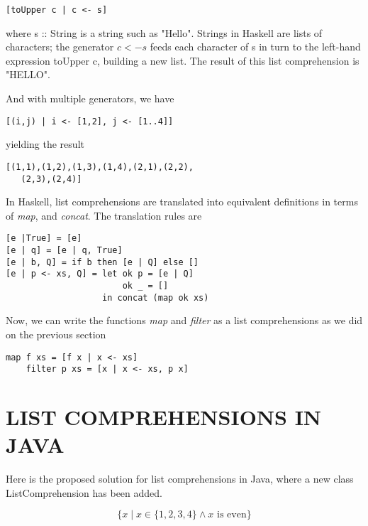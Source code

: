 \documentclass[%
 reprint,
 amsmath,amssymb,
 aps,
]{revtex4-1}
\begin{document}
    \begin{lstlisting}[frame=none]
    [toUpper c | c <- s]
    \end{lstlisting}

	where s :: String is a string such as "Hello". Strings in Haskell are lists of characters; the generator $c <- s$ feeds each character of s in turn to the left-hand expression toUpper c, building a new list. The result of this list comprehension is "HELLO".\cite{haskellwiki}

    And with multiple generators, we have

    \begin{lstlisting}[frame=none]
    [(i,j) | i <- [1,2], j <- [1..4]]
    \end{lstlisting}

	yielding the result

    \begin{lstlisting}[frame=none]
    [(1,1),(1,2),(1,3),(1,4),(2,1),(2,2),
   (2,3),(2,4)]
    \end{lstlisting}

    In Haskell, list comprehensions are translated into equivalent definitions in terms of \emph{map}, and \emph{concat}\cite{wadler}. The translation rules are

    \begin{lstlisting}[frame=none]
[e |True] = [e]
[e | q] = [e | q, True]
[e | b, Q] = if b then [e | Q] else []
[e | p <- xs, Q] = let ok p = [e | Q]
                       ok _ = []
                   in concat (map ok xs)
    \end{lstlisting}

    Now, we can write the functions \emph{map} and \emph{filter} as a list comprehensions as we did on the previous section

    \begin{lstlisting}[frame=none]
       map f xs = [f x | x <- xs]
    filter p xs = [x | x <- xs, p x]
    \end{lstlisting}

\section{LIST COMPREHENSIONS IN JAVA}

	Here is the proposed solution for list comprehensions in Java, where a new class ListComprehension has been added.

    \[
    \{ x \mid x \in \{1,2,3,4\} \wedge x \mbox{ is even} \}
    \]
\end{document}
